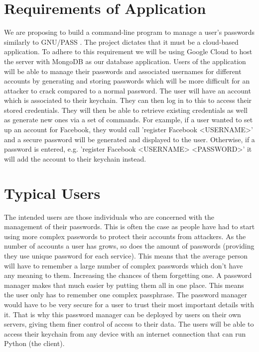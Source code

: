 \documentclass[11pt]{article}
\begin{document}
\section{Requirements of Application}
We are proposing to build a command-line program to manage a user's passwords similarly to GNU/PASS \parencite{GNU/PASS}. The project dictates that it must be a cloud-based application. To adhere to this requirement we will be using Google Cloud \parencite{GoogleCloud} to host the server with MongoDB \parencite{MongoDB} as our database application. Users of the application will be able to manage their passwords and associated usernames for different accounts by generating and storing passwords which will be more difficult for an attacker to crack compared to a normal password. The user will have an account which is associated to their keychain. They can then log in to this to access their stored credentials. They will then be able to retrieve existing credentials as well as generate new ones via a set of commands. For example, if a user wanted to set up an account for Facebook, they would call 'register Facebook <USERNAME>' and a secure password will be generated and displayed to the user. Otherwise, if a password is entered, e.g. 'register Facebook <USERNAME> <PASSWORD>' it will add the account to their keychain instead.
\section{Typical Users}
The intended users are those individuals who are concerned with the management of their passwords. This is often the case as people have had to start using more complex passwords to protect their accounts from attackers. As the number of accounts a user has grows, so does the amount of passwords (providing they use unique password for each service). This means that the average person will have to remember a large number of complex passwords which don't have any meaning to them. Increasing the chances of them forgetting one. A password manager makes that much easier by putting them all in one place. This means the user only has to remember one complex passphrase. The password manager would have to be very secure for a user to trust their most important details with it. That is why this password manager can be deployed by users on their own servers, giving them finer control of access to their data. The users will be able to access their keychain from any device with an internet connection that can run Python (the client).
\end{document}
